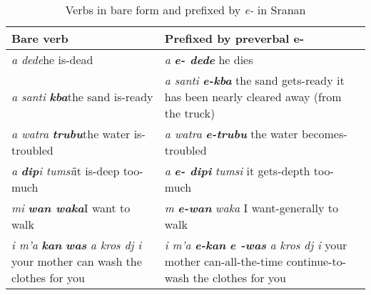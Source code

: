 \begin{table}[t]
  \caption{Verbs in bare form and prefixed by \textit{e-} in Sranan
    \citep[377--378]{Voorhoeve1957}}
  \label{tab:srananverbs}
  \begin{tabularx}{\textwidth}{QQ}
    \lsptoprule

    Bare verb & Prefixed by preverbal e-\\
    \midrule \textit{a dede}\newline he is-dead & \textit{a}
    \textbf{\textit{e- dede}}\newline
    he dies \\

    \tablevspace \textit{a santi} \textbf{\textit{kba}}\newline the
    sand is-ready & \textit{a santi} \textbf{\textit{e-kba}}\newline
    the sand gets-ready\newline
    it has been nearly cleared away (from the         truck)\\

    \tablevspace \textit{a watra} \textbf{\textit{trubu}}\newline the
    water is-troubled & \textit{a watra}
    \textbf{\textit{e-trubu}}\newline
    the water becomes-troubled\\

    \tablevspace \textit{a} \textbf{\textit{dip}}\textit{i
      tumsi}\newline it is-deep too-much & \textit{ a}
    \textbf{\textit{e- dipi}} \textit{tumsi}\newline
    it gets-depth too-much\\

    \tablevspace \textit{mi} \textbf{\textit{wan waka}}\newline I want
    to walk & \textit{m} \textbf{\textit{e-wan}} \textit{waka}\newline
    I want-generally to walk\\

    \tablevspace \textit{i m’a} \textbf{\textit{kan}}
    \textbf{\textit{was}} \textit{a kros dj i} \newline your mother
    can wash the clothes for you & \textit{i m’a}
    \textbf{\textit{e-kan}} \textbf{\textit{e -was} }\textit{a kros dj
      i}\newline
    your mother can-all-the-time continue-to-wash the clothes for you\\


\end{tabularx}
\end{table}
